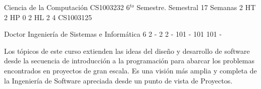 \documentclass[a4paper,8pt]{article}
\begin{document}
\setNombreProfesor{}
\setGradoProfesorAbreviado{}
\sylabusHeader

\academicaTable
{Ciencia de la Computación} %
{CS1003232} %
{6$^{to}$ Semestre.} %
{Semestral} %
{17 Semanas} %
{2 HT} %
{2 HP} %
{0} %
{2 HL}  %
{2} %
{4} %
{CS1003125} %

\administrativaTable
{Doctor} %
{Ingeniería de Sistemas e Informática} %
{6} %
{2} %
{-} %
{2} %
{2} %
{-} %
{101} %
{-} %
{101} %
{101} %
{-} %


\begin{fundamentacion}
Los tópicos de este curso extienden las ideas del diseño y desarrollo de software desde la secuencia de introducción a la programación para
abarcar los problemas encontrados en proyectos de gran escala. Es una visión más amplia y completa de la Ingeniería
de Software apreciada desde un punto de vista de Proyectos.

\end{fundamentacion}

\begin{sumilla}
\item \SEToolsandEnvironments
\item \SESoftwareVerificationandValidation
\item \SESoftwareEvolution
\item \SESoftwareProjectManagement

\end{sumilla}

\begin{competenciasAsignatura}
\item {}
\item {}
\item {}
\item {}
\item {}
\item {}
\item {}
\item {}
\item {}

\end{competenciasAsignatura}
\end{document}
